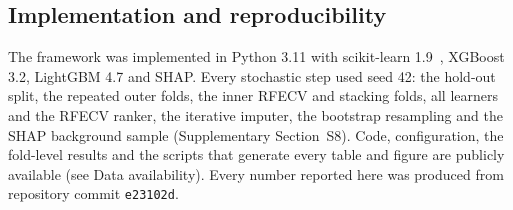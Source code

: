 \subsection{Implementation and reproducibility}
The framework was implemented in Python 3.11 with scikit-learn 1.9~\cite{pedregosa2011sklearn}, XGBoost 3.2, LightGBM 4.7 and SHAP. Every stochastic step used seed 42: the hold-out split, the repeated outer folds, the inner RFECV and stacking folds, all learners and the RFECV ranker, the iterative imputer, the bootstrap resampling and the SHAP background sample (Supplementary Section~S8). Code, configuration, the fold-level results and the scripts that generate every table and figure are publicly available (see Data availability). Every number reported here was produced from repository commit \texttt{e23102d}.
